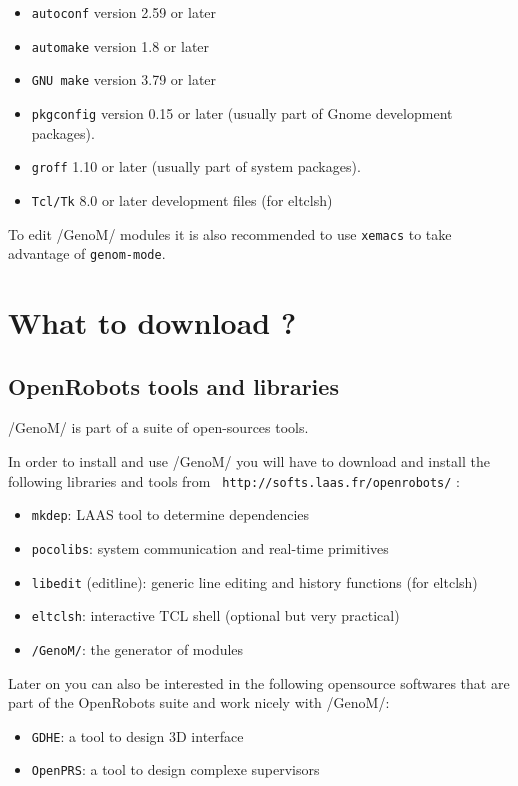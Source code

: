 \begin{itemize}
\item {\tt autoconf} version 2.59 or later
\item {\tt automake} version 1.8 or later
\item {\tt GNU make} version 3.79 or later
\item {\tt pkgconfig} version 0.15 or later (usually part of Gnome development packages).
\item {\tt groff} 1.10 or later (usually part of system packages).
\item {\tt Tcl/Tk} 8.0 or later development files (for eltclsh)
\end{itemize}

To edit /GenoM/ modules it is also recommended to use {\tt xemacs} to take
advantage of {\tt genom-mode}.

\section{What to download ?}
\label{sec|configuration|download}

\subsection{OpenRobots tools and libraries}

/GenoM/ is part of a suite of open-sources tools. 

In order to install and use /GenoM/ you will have to download and install
the following libraries and tools from  {\tt
http://softs.laas.fr/openrobots/} :

\begin{itemize}
\item {\tt mkdep}: LAAS tool to determine dependencies
\item {\tt pocolibs}: system communication and real-time primitives
\item {\tt libedit} (editline): generic line editing and history
functions (for eltclsh)
\item {\tt eltclsh}: interactive TCL shell (optional but very practical)
\item {\tt /GenoM/}: the generator of modules
\end{itemize}

Later on you can also be interested in the following opensource softwares
that are part of the OpenRobots suite and work nicely with /GenoM/:

\begin{itemize}
\item {\tt GDHE}: a tool to design 3D interface
\item {\tt OpenPRS}: a tool to design complexe supervisors
\end{itemize}

